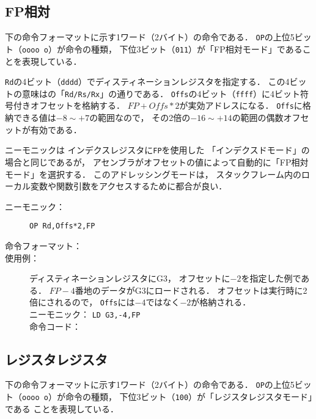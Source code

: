 \subsection{FP相対}
下の命令フォーマットに示す1ワード（2バイト）の命令である．
\texttt{OP}の上位5ビット（\texttt{oooo o}）が命令の種類，
下位3ビット（\texttt{011}）が「FP相対モード」であることを表現している．

\texttt{Rd}の4ビット（\texttt{dddd}）でディスティネーションレジスタを指定する．
この4ビットの意味はの「\texttt{Rd/Rs/Rx}」の通りである．
\texttt{Offs}の4ビット（\texttt{ffff}）に4ビット符号付きオフセットを格納する．
$FP + Offs * 2$が実効アドレスになる．
\texttt{Offs}に格納できる値は$-8 \sim +7$の範囲なので，
その2倍の$-16 \sim +14$の範囲の偶数オフセットが有効である．

ニーモニックは
インデクスレジスタに\texttt{FP}を使用した
「インデクスドモード」の場合と同じであるが，
アセンブラがオフセットの値によって自動的に「FP相対モード」を選択する．
このアドレッシングモードは，
スタックフレーム内のローカル変数や関数引数をアクセスするために都合が良い．

\begin{description}
\item[ニーモニック：] \texttt{OP Rd,Offs*2,FP}

\item[命令フォーマット：] %

\item[使用例：] ディスティネーションレジスタにG3，
オフセットに$-2$を指定した例である．
$FP - 4$番地のデータがG3にロードされる．
オフセットは実行時に2倍にされるので，
\texttt{Offs}には$-4$ではなく$-2$が格納される． \\
ニーモニック： \texttt{LD G3,-4,FP}\\
命令コード：
\end{description}

\subsection{レジスタレジスタ}
下の命令フォーマットに示す1ワード（2バイト）の命令である．
\texttt{OP}の上位5ビット（\texttt{oooo o}）が命令の種類，
下位3ビット（\texttt{100}）が「レジスタレジスタモード」である
ことを表現している．

